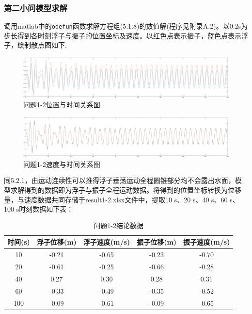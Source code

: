 \documentclass{article}
\numberwithin{equation}{subsection}
\begin{document}
\subsubsection{第二小问模型求解}
调用matlab中的\verb|odefun|函数求解方程组(5.1.8)的数值解(程序见附录A.2)。以0.2s为步长得到各时刻浮子与振子的位置坐标及速度。以红色点表示振子，蓝色点表示浮子，绘制散点图如下.
\begin{figure}[H]
    \centering
    \includegraphics[scale=0.3]{问题1-2位移.png}
    \caption{问题1-2位置与时间关系图}
\end{figure}
\begin{figure}[H]
    \centering
    \includegraphics[scale=0.3]{问题1-2速度.png}
    \caption{问题1-2速度与时间关系图}
\end{figure}

同5.2.1，由运动连续性可以推得浮子垂荡运动全程圆锥部分均不会露出水面，模型求解得到的数据即为浮子与振子全程运动数据。将得到的位置坐标转换为位移量，与速度数据共同存储于result1-2.xlsx文件中，提取10 s、20 s、40 s、60 s、100 s时刻数据如下表：


\begin{table}[!htbp]
    \centering
    \begin{tabular}{|c|c|c|c|c|}\hline
        时间(s) &浮子位移(m)&浮子速度(m/s)&振子位移(m)&振子速度(m/s)\\\hline
        10&-0.21&	-0.65	&-0.23	&-0.70
        \\
        20&-0.61&	-0.25	&-0.66	&-0.28

        \\
        40&0.27	&0.30&	0.28&	0.31

        \\
        60&-0.33	&-0.49&	-0.35&	-0.52

        \\
        100&-0.09&	-0.61&	-0.09&	-0.65

        \\
        \hline
    \end{tabular}
    \caption{问题1-2结论数据}
\end{table}
\end{document}
